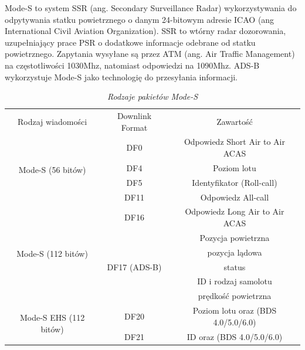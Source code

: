 \documentclass[eng,printmode]{mgr}
\begin{document}
Mode-S to system SSR (ang. Secondary Surveillance Radar) wykorzystywania do odpytywania statku powietrznego o danym 24-bitowym adresie ICAO (ang International Civil Aviation Organization). SSR to wtórny radar dozorowania, uzupełniający prace PSR o dodatkowe informacje odebrane od statku powietrznego. Zapytania wysyłane są przez ATM (ang. Air Traffic Management) na częstotliwości 1030Mhz, natomiast odpowiedzi na 1090Mhz. ADS-B wykorzystuje Mode-S jako technologię do przesyłania informacji.
\begin{table}[ph]
\caption{\textit{ Rodzaje pakietów Mode-S}}
\label{tab:adsb}
  \centering
  \def\arraystretch{1.3}%
  \begin{tabular}{|c|c|c|}
  \hline
  \multicolumn{1}{|c|}{Rodzaj wiadomości} & \multicolumn{1}{c|}{Downlink Format} & \multicolumn{1}{c|}{Zawartość} \\\cline{1-3}
  \multirow{4}{*}{Mode-S (56 bitów)} 
  				 & \multicolumn{1}{c|}{DF0} & \multicolumn{1}{c|}{Odpowiedz Short Air to Air ACAS} \\\cline{2-3}
                 & \multicolumn{1}{c|}{DF4} & \multicolumn{1}{c|}{Poziom lotu} \\\cline{2-3}
                 & \multicolumn{1}{c|}{DF5} & \multicolumn{1}{c|}{Identyfikator (Roll-call)} \\\cline{2-3}
                 & \multicolumn{1}{c|}{DF11} & \multicolumn{1}{c|}{Odpowiedz All-call} \\\hline
  \multirow{6}{*}{Mode-S (112 bitów)} 
  				 & \multicolumn{1}{c|}{DF16} & \multicolumn{1}{c|}{Odpowiedz Long Air to Air ACAS} \\\cline{2-3}
                 & \multirow{5}{*}{DF17 (ADS-B)} & Pozycja powietrzna \\\hhline{~~~} 
                 &                       & pozycja lądowa \\\hhline{~~~} 
                 &                       & status \\\hhline{~~~} 
                 &                       & ID i rodzaj samolotu  \\\hhline{~~~} 
                 &                       & prędkość powietrzna \\\hline
 \multirow{2}{*}{Mode-S EHS (112 bitów)} 
	& \multicolumn{1}{c|}{DF20} & \multicolumn{1}{c|}{Poziom lotu oraz (BDS 4.0/5.0/6.0)} \\\cline{2-3}
	& \multicolumn{1}{c|}{DF21} & \multicolumn{1}{c|}{ID oraz (BDS 4.0/5.0/6.0)} \\\hline
 \end{tabular}
\end{table}
\newpage
\end{document}

